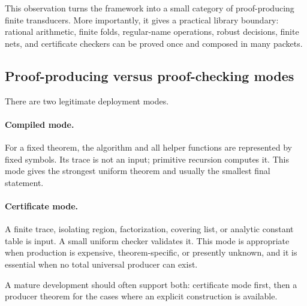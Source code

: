 This observation turns the framework into a small category of proof-producing
finite transducers.  More importantly, it gives a practical library boundary:
rational arithmetic, finite folds, regular-name operations, robust decisions,
finite nets, and certificate checkers can be proved once and composed in many
packets.

\subsection{Proof-producing versus proof-checking modes}

There are two legitimate deployment modes.

\paragraph{Compiled mode.}
For a fixed theorem, the algorithm and all helper functions are represented by
fixed  symbols.  Its trace is not an input; primitive recursion
computes it.  This mode gives the strongest uniform theorem and usually the
smallest final statement.

\paragraph{Certificate mode.}
A finite trace, isolating region, factorization, covering list, or analytic
constant table is input.  A small uniform checker validates it.  This mode is
appropriate when production is expensive, theorem-specific, or presently
unknown, and it is essential when no total universal producer can exist.

A mature development should often support both: certificate mode first, then a
producer theorem for the cases where an explicit construction is available.
